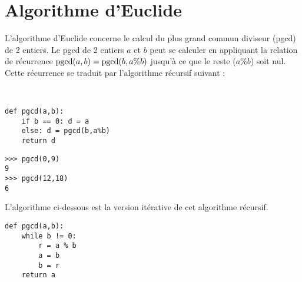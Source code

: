 \section*{Algorithme d'Euclide}
L'algorithme d'Euclide concerne le calcul du plus grand commun diviseur (pgcd) 
de 2 entiers. Le pgcd de 2 entiers $a$ et $b$ peut se calculer en appliquant 
la relation de récurrence ${\rm pgcd}(a,b) = {\rm pgcd}(b,a\%b)$ 
jusqu'à ce que le reste ($a\%b$) soit nul. Cette récurrence se traduit 
par l'algorithme récursif suivant :

\mbox{}\ \ \begin{py}{8cm}
\begin{verbatim}
def pgcd(a,b):
    if b == 0: d = a
    else: d = pgcd(b,a%b)
    return d
\end{verbatim}
\end{py}
\hfill
\begin{py}{5cm}
\begin{verbatim}
>>> pgcd(0,9)
9
>>> pgcd(12,18)
6
\end{verbatim}
\end{py}
\vspace*{2mm}

\noindent L'algorithme ci-dessous est la version itérative de cet algorithme 
récursif.

\begin{lstlisting}[caption={\bf Algorithme d'Euclide},label=cl:euclide]
def pgcd(a,b):
    while b != 0:
        r = a % b
        a = b
        b = r	
    return a
\end{lstlisting}

